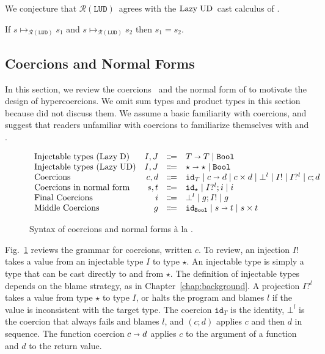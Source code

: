 \documentclass[runningheads]{llncs}
\newcommand{\stxrule}[3]{\text{#2} & #1 & \Coloneqq & #3\\}
\newcommand{\figref}[1]{Fig.~\ref{#1}}
\newcommand{\LUD}{\ensuremath{\text{Lazy\;UD}}}
\newcommand{\LD}{\ensuremath{\text{Lazy\;D}}}
\newcommand{\RMachine}[1]{\ensuremath{\mathcal{R}(#1)}}
\newcommand{\LUDMachine}{\RMachine{\BLUD}}
\newcommand{\Tdyn}[0]{\ensuremath{\star}}
\newcommand{\Pbool}[0]{\ensuremath{\mathtt{Bool}}}
\newcommand{\Pfunc}[2]{\ensuremath{#1 \shortrightarrow #2}}
\newcommand{\Pprod}[2]{\ensuremath{#1 \times #2}}
\newcommand{\BLUD}[0]{\ensuremath{\mathtt{LUD}}}
\newcommand{\cnfproj}[2]{#1?^{#2}}
\newcommand{\cnfinj}[1]{#1!}
\newcommand{\cnfseq}[2]{#1;#2}
\newcommand{\cnffail}[1]{\bot^{#1}}
\newcommand{\cnffunc}[2]{\Pfunc{#1}{#2}}
\newcommand{\cnfprod}[2]{\Pprod{#1}{#2}}
\newcommand{\cnfid}[1]{\ensuremath{\mathtt{id}_{#1}}}
\newcommand{\reducetoR}[3]{\ensuremath{#2 \longmapsto_{\RMachine{#1}} #3}}
\newcommand{\reducetoUD}[2]{\reducetoR{\BLUD}{#1}{#2}}
\begin{document}
We conjecture that \LUDMachine\ agrees with the \LUD\ cast
calculus of \citep{siek2009exploring}.

\begin{proposition}[\LUDMachine\ is deterministic]
	If $\reducetoUD{s}{s_1}$ and $\reducetoUD{s}{s_2}$ 
	then $s_1 = s_2$.
\end{proposition}

\subsection{Coercions and Normal Forms} 
\label{sec:coercion-calculus}

In this section, we review the
coercions~\citep{henglein1994dynamic,herman2010space} and the normal form of
\citet{siek2012interpretations} to motivate the design of hypercoercions.  We
omit sum types and product types in this section because
\citet{siek2012interpretations} did not discuss them. We assume a basic
familiarity with coercions, and suggest that readers unfamiliar with coercions
to familiarize themselves with \citet{siek2012interpretations} and
\citet{Siek:2015:BCT:2737924.2737968}.

\begin{figure}
	\[
	\begin{array}{lrcl}
	\stxrule{I,J}{Injectable types (\LD)}{
		\Pfunc{T}{T} \mid \Pbool}
	\stxrule{I,J}{Injectable types (\LUD)}{
		\Pfunc{\Tdyn}{\Tdyn} \mid \Pbool
	}
	\stxrule{c,d}{Coercions}{
		\cnfid{T}       \mid
		\cnffunc{c}{d}  \mid
		\cnfprod{c}{d}  \mid
		\cnffail{l}     \mid
		\cnfinj{I}      \mid
		\cnfproj{I}{l}  \mid
		\cnfseq{c}{d}
	}
	\stxrule{s,t}{Coercions in normal form}{
		\cnfid{\Tdyn}       \mid
		\cnfseq{\cnfproj{I}{l}}{i} \mid
		i
	}
	\stxrule{i}{Final Coercions}{
		\cnffail{l} \mid
		\cnfseq{g}{\cnfinj{I}} \mid
		g
	}
	\stxrule{g}{Middle Coercions}{
		\cnfid{\Pbool} \mid
		\cnffunc{s}{t} \mid
		\cnfprod{s}{t}
	}
	\end{array}
	\]
	\caption{Syntax of coercions and normal forms {\`a} la 
		\citep{siek2012interpretations}.}
	\label{fig:normal-coercion}
\end{figure}

\figref{fig:normal-coercion} reviews the grammar for coercions,
written $c$.
%
To review, an injection $\cnfinj{I}$ takes a value from an injectable type
$I$ to type $\Tdyn$. An injectable type is simply a type that can be
cast directly to and from $\Tdyn$. The
definition of injectable types depends on the blame strategy, as in 
Chapter~\ref{chap:background}.
%
A projection $I?^l$ takes a value from type $\Tdyn$ to type $I$, or
halts the program and blames $l$ if the value is inconsistent with 
the target type.
The coercion \cnfid{T} is the identity, $\bot^{l}$ is the coercion that
always fails and blames $l$, and $(\cnfseq{c}{d})$ applies $c$ and
then $d$ in sequence. The function coercion $\cnffunc{c}{d}$
applies $c$ to the argument of a function and $d$ to the return
value.
\end{document}
